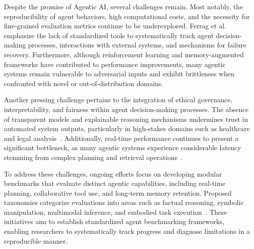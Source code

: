 \vspace{0.5cm}

Despite the promise of Agentic AI, several challenges remain. Most notably, the reproducibility of agent behaviors, high computational costs, and the necessity for fine-grained evaluation metrics continue to be underexplored. Ferrag et al.~\cite{ferrag2025can} emphasize the lack of standardized tools to systematically track agent decision-making processes, interactions with external systems, and mechanisms for failure recovery. Furthermore, although reinforcement learning and memory-augmented frameworks have contributed to performance improvements, many agentic systems remain vulnerable to adversarial inputs and exhibit brittleness when confronted with novel or out-of-distribution domains.

\vspace{0.5cm}

Another pressing challenge pertains to the integration of ethical governance, interpretability, and fairness within agent decision-making processes. The absence of transparent models and explainable reasoning mechanisms undermines trust in automated system outputs, particularly in high-stakes domains such as healthcare and legal analysis~\cite{doshi-velez2017towards, barocas2019fairness, rudin2019stop}. Additionally, real-time performance continues to present a significant bottleneck, as many agentic systems experience considerable latency stemming from complex planning and retrieval operations~\cite{sutton2018reinforcement, huang2021efficient}.

\vspace{0.5cm}

To address these challenges, ongoing efforts focus on developing modular benchmarks that evaluate distinct agentic capabilities, including real-time planning, collaborative tool use, and long-term memory retention. Proposed taxonomies categorize evaluations into areas such as factual reasoning, symbolic manipulation, multimodal inference, and embodied task execution~\cite{perez2021modular, muller2023taxonomy, lewis2020retrieval, dosovitskiy2020standardized, bosselut2021comet}. These initiatives aim to establish standardized agent benchmarking frameworks, enabling researchers to systematically track progress and diagnose limitations in a reproducible manner.

\vspace{0.5cm}

